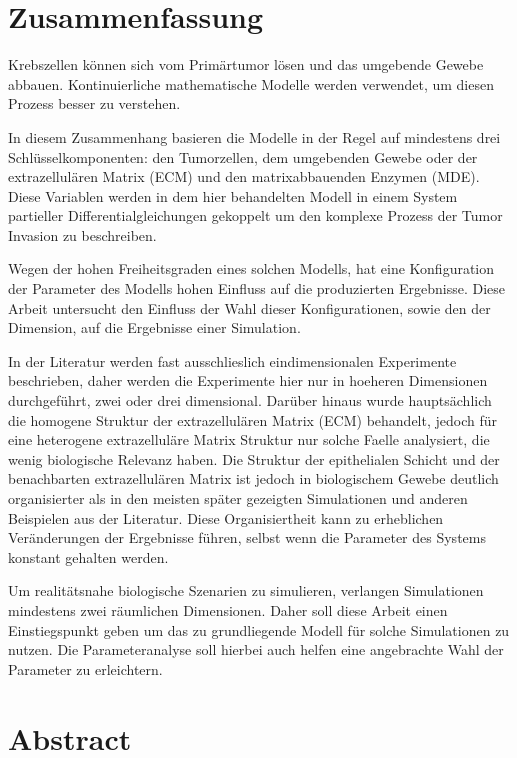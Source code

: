 \section*{Zusammenfassung}

Krebszellen können sich vom Primärtumor lösen und das umgebende Gewebe abbauen. 
Kontinuierliche mathematische Modelle werden verwendet, um diesen Prozess besser zu verstehen.

In diesem Zusammenhang basieren die Modelle in der Regel auf mindestens drei Schlüsselkomponenten: den Tumorzellen, dem umgebenden Gewebe oder der extrazellulären Matrix (ECM) und den matrixabbauenden Enzymen (MDE). Diese Variablen werden in dem hier behandelten Modell in einem System partieller Differentialgleichungen gekoppelt um den komplexe Prozess der Tumor Invasion zu beschreiben.

Wegen der hohen Freiheitsgraden eines solchen Modells, hat eine Konfiguration der Parameter des Modells hohen Einfluss auf die produzierten Ergebnisse. Diese Arbeit untersucht den Einfluss der Wahl dieser Konfigurationen, sowie den der Dimension, auf die Ergebnisse einer Simulation.

In der Literatur werden fast ausschlieslich eindimensionalen Experimente beschrieben, daher werden die Experimente hier nur in hoeheren Dimensionen durchgeführt, zwei oder drei dimensional. Darüber hinaus wurde hauptsächlich die homogene Struktur der extrazellulären Matrix (ECM) behandelt, jedoch für eine heterogene extrazelluläre Matrix Struktur nur solche Faelle analysiert, die wenig biologische Relevanz haben. Die Struktur der epithelialen Schicht und der benachbarten extrazellulären Matrix ist jedoch in biologischem Gewebe deutlich organisierter als in den meisten später gezeigten Simulationen und anderen Beispielen aus der Literatur. Diese Organisiertheit kann zu erheblichen Veränderungen der Ergebnisse führen, selbst wenn die Parameter des Systems konstant gehalten werden.

Um realitätsnahe biologische Szenarien zu simulieren, verlangen Simulationen mindestens zwei räumlichen Dimensionen. Daher soll diese Arbeit einen Einstiegspunkt geben um das zu grundliegende Modell für solche Simulationen zu nutzen. Die Parameteranalyse soll hierbei auch helfen eine angebrachte Wahl der Parameter zu erleichtern.

\clearpage
\section*{Abstract}

